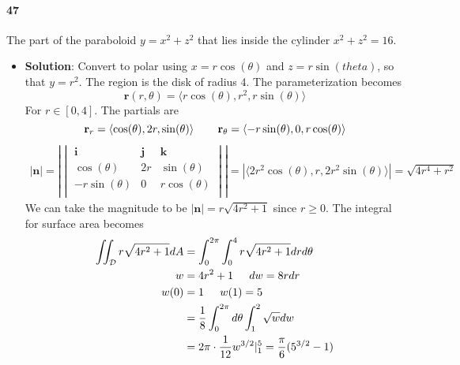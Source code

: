 \documentclass{article}
\begin{document}
    \paragraph{47} The part of the paraboloid $y=x^2+z^2$ that lies inside the cylinder $x^2+z^2=16$.
    \begin{itemize}
        \item \textbf{Solution}: Convert to polar using $x=r\cos(\theta)$ and $z=r\sin(theta)$, so that $y=r^2$. The region is the disk of radius 4. The parameterization becomes
        \[ \mathbf{r}(r,\theta) = \langle r\cos(\theta), r^2, r\sin(\theta) \rangle \]
        For $r \in [0,4]$. The partials are
        \[ \mathbf{r}_r = \langle \cos(\theta), 2r, \sin(\theta) \rangle \hspace{0.3in} \mathbf{r}_{\theta} = \langle -r\sin(\theta), 0, r\cos(\theta) \rangle \]
        \begin{align*}
            |\mathbf{n}| = |\begin{vmatrix}
                \mathbf{i} & \mathbf{j} & \mathbf{k}\\
                \cos(\theta) & 2r & \sin(\theta)\\
                -r\sin(\theta) & 0 & r\cos(\theta)\\
            \end{vmatrix}| = |\langle 2r^2\cos(\theta), r, 2r^2\sin(\theta) \rangle | = \sqrt{4r^4 + r^2}
        \end{align*}
        We can take the magnitude to be $|\mathbf{n}| = r\sqrt{4r^2+1}$ since $r \geq 0$. The integral for surface area becomes
        \begin{align*}
            \iint_{\mathcal{D}}r\sqrt{4r^2+1}dA &= \int_0^{2\pi} \int_0^4 r\sqrt{4r^2+1}drd\theta\\
            w &= 4r^2 + 1 \hspace{0.2in} dw = 8rdr \\
            w(0) &= 1 \hspace{0.2in} w(1) = 5\\
            &= \frac{1}{8}\int_0^{2\pi}d\theta \int_1^2 \sqrt{w}dw \\
            &= 2\pi\cdot \frac{1}{12}w^{3/2}|_1^5 = \frac{\pi}{6}(5^{3/2}-1)
        \end{align*}
    \end{itemize}
    
\end{document}
